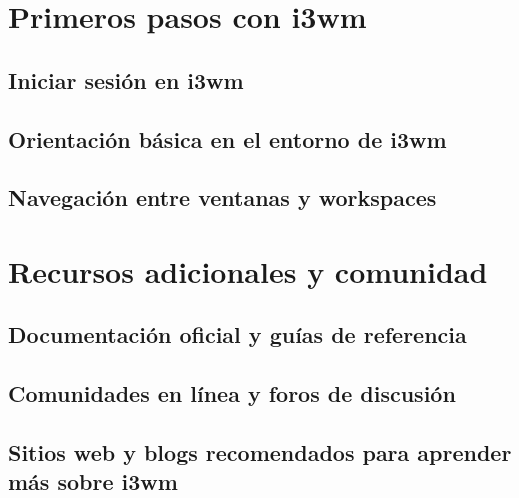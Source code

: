 \documentclass[
  a4paper,
]{article}
\begin{document}
\hypertarget{primeros-pasos-con-i3wm}{%
\section{Primeros pasos con i3wm}\label{primeros-pasos-con-i3wm}}

\hypertarget{iniciar-sesiuxf3n-en-i3wm}{%
\subsection{Iniciar sesión en i3wm}\label{iniciar-sesiuxf3n-en-i3wm}}

\hypertarget{orientaciuxf3n-buxe1sica-en-el-entorno-de-i3wm}{%
\subsection{Orientación básica en el entorno de
i3wm}\label{orientaciuxf3n-buxe1sica-en-el-entorno-de-i3wm}}

\hypertarget{navegaciuxf3n-entre-ventanas-y-workspaces}{%
\subsection{Navegación entre ventanas y
workspaces}\label{navegaciuxf3n-entre-ventanas-y-workspaces}}

\hypertarget{recursos-adicionales-y-comunidad}{%
\section{Recursos adicionales y
comunidad}\label{recursos-adicionales-y-comunidad}}

\hypertarget{documentaciuxf3n-oficial-y-guuxedas-de-referencia}{%
\subsection{Documentación oficial y guías de
referencia}\label{documentaciuxf3n-oficial-y-guuxedas-de-referencia}}

\hypertarget{comunidades-en-luxednea-y-foros-de-discusiuxf3n}{%
\subsection{Comunidades en línea y foros de
discusión}\label{comunidades-en-luxednea-y-foros-de-discusiuxf3n}}

\hypertarget{sitios-web-y-blogs-recomendados-para-aprender-muxe1s-sobre-i3wm}{%
\subsection{Sitios web y blogs recomendados para aprender más sobre
i3wm}\label{sitios-web-y-blogs-recomendados-para-aprender-muxe1s-sobre-i3wm}}


\printbibliography
\end{document}
